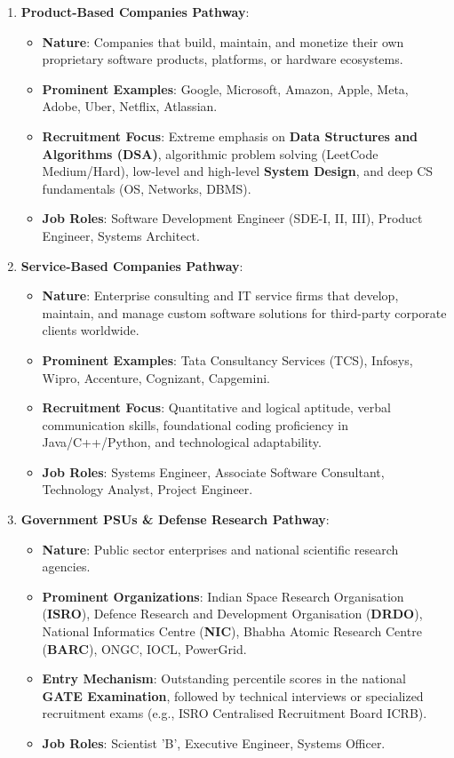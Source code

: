 \begin{enumerate}[leftmargin=1.5em]
    \item \textbf{Product-Based Companies Pathway}:
    \begin{itemize}
        \item \textbf{Nature}: Companies that build, maintain, and monetize their own proprietary software products, platforms, or hardware ecosystems.
        \item \textbf{Prominent Examples}: Google, Microsoft, Amazon, Apple, Meta, Adobe, Uber, Netflix, Atlassian.
        \item \textbf{Recruitment Focus}: Extreme emphasis on \textbf{Data Structures and Algorithms (DSA)}, algorithmic problem solving (LeetCode Medium/Hard), low-level and high-level \textbf{System Design}, and deep CS fundamentals (OS, Networks, DBMS).
        \item \textbf{Job Roles}: Software Development Engineer (SDE-I, II, III), Product Engineer, Systems Architect.
    \end{itemize}

    \item \textbf{Service-Based Companies Pathway}:
    \begin{itemize}
        \item \textbf{Nature}: Enterprise consulting and IT service firms that develop, maintain, and manage custom software solutions for third-party corporate clients worldwide.
        \item \textbf{Prominent Examples}: Tata Consultancy Services (TCS), Infosys, Wipro, Accenture, Cognizant, Capgemini.
        \item \textbf{Recruitment Focus}: Quantitative and logical aptitude, verbal communication skills, foundational coding proficiency in Java/C++/Python, and technological adaptability.
        \item \textbf{Job Roles}: Systems Engineer, Associate Software Consultant, Technology Analyst, Project Engineer.
    \end{itemize}

    \item \textbf{Government PSUs \& Defense Research Pathway}:
    \begin{itemize}
        \item \textbf{Nature}: Public sector enterprises and national scientific research agencies.
        \item \textbf{Prominent Organizations}: Indian Space Research Organisation (\textbf{ISRO}), Defence Research and Development Organisation (\textbf{DRDO}), National Informatics Centre (\textbf{NIC}), Bhabha Atomic Research Centre (\textbf{BARC}), ONGC, IOCL, PowerGrid.
        \item \textbf{Entry Mechanism}: Outstanding percentile scores in the national \textbf{GATE Examination}, followed by technical interviews or specialized recruitment exams (e.g., ISRO Centralised Recruitment Board ICRB).
        \item \textbf{Job Roles}: Scientist 'B', Executive Engineer, Systems Officer.
    \end{itemize}


\end{enumerate}
